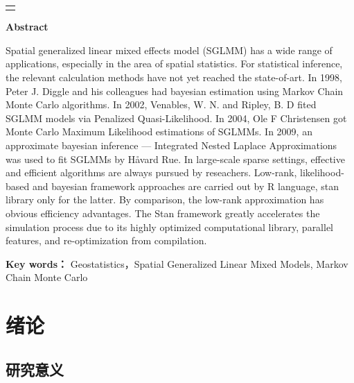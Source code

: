 \documentclass[hyperref, a4paper, UTF8, zihao = -4, linespread = 1.25, scheme = chinese]{ctexbook}
\begin{document}
\par
\vspace{1cm}
\noindent\begin{tabular}{l}
\toprule[1pt]\hline
\hspace*{14.5cm}
\end{tabular}

\begin{center}
{\bf \Large Abstract}\\
\vskip 0.6cm
\end{center}
\par
Spatial generalized linear mixed effects model (SGLMM) has a wide range of applications, especially in the area of spatial statistics. For statistical inference, the relevant calculation methods have not yet reached the state-of-art. In 1998, Peter J. Diggle and his colleagues had bayesian estimation using Markov Chain Monte Carlo algorithms. In 2002, Venables, W. N. and Ripley, B. D fited SGLMM models via Penalized Quasi-Likelihood. In 2004, Ole F Christensen got Monte Carlo Maximum Likelihood estimations of SGLMMs. In 2009, an approximate bayesian inference --- Integrated Nested Laplace Approximations was used to fit SGLMMs by H{\aa}vard Rue. In large-scale sparse settings, effective and efficient algorithms are always pursued by reseachers. Low-rank, likelihood-based and bayesian framework approaches are carried out by R language, stan library only for the latter. By comparison, the low-rank approximation has obvious efficiency advantages. The Stan framework greatly accelerates the simulation process due to its highly optimized computational library, parallel features, and re-optimization from compilation.
\medskip
\par

{\bf Key words：} Geostatistics，Spatial Generalized Linear Mixed Models, Markov Chain Monte Carlo

\newpage 
\mbox{} 


{
\setcounter{tocdepth}{3}
\tableofcontents
}
\mainmatter

\hypertarget{intro}{%
\chapter{绪论}\label{intro}}

\section{研究意义}
\end{document}

